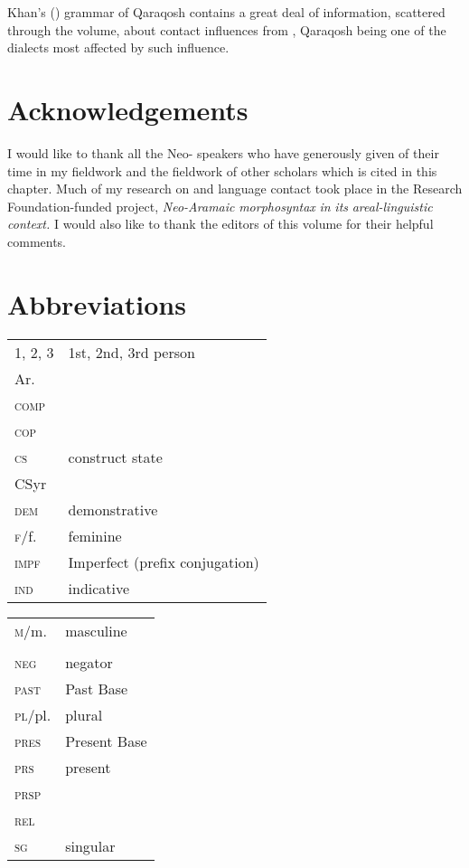 \documentclass[output=paper]{langsci/langscibook}
\begin{document}
Khan's (\citeyear{Khan2002}) grammar of  Qaraqosh contains a great deal of information, scattered through the volume, about contact influences from , Qaraqosh being one of the dialects most affected by such influence.

\section*{Acknowledgements}

I would like to thank all the Neo- speakers who have generously given of their time in my fieldwork and the fieldwork of other scholars which is cited in this chapter. Much of my research on  and language contact took place in the  Research Foundation-funded project, \textit{Neo-Aramaic} \textit{morphosyntax} \textit{in} \textit{its} \textit{areal-linguistic} \textit{context.} I would also like to thank the editors of this volume for their helpful comments.

\section*{Abbreviations}

\begin{tabularx}{.55\textwidth}{@{}lQ@{}}
\textsc{1, 2, 3} & 1st, 2nd, 3rd person \\
Ar.            & \\
\textsc{comp}    & \\
\textsc{cop}     & \\
\textsc{cs}     & construct state\\
CSyr           &  \\
\textsc{dem}     & demonstrative \\
\textsc{f}/f.    & feminine\\
\textsc{impf}   & Imperfect (prefix conjugation)\\
\textsc{ind}     & indicative\\
\end{tabularx}%
\begin{tabularx}{.5\textwidth}{@{}lQ@{}}
\textsc{m}/m.    & masculine\\
        &   \\ 
\textsc{neg}    & negator\\
\textsc{past}   &  Past Base\\
\textsc{pl}/pl.  & plural\\
\textsc{pres}    &  Present Base \\
\textsc{prs}    & present \\
\textsc{prsp}    &  \\
\textsc{rel}     & \\
\textsc{sg}  & singular
\end{tabularx}%
\end{document}
